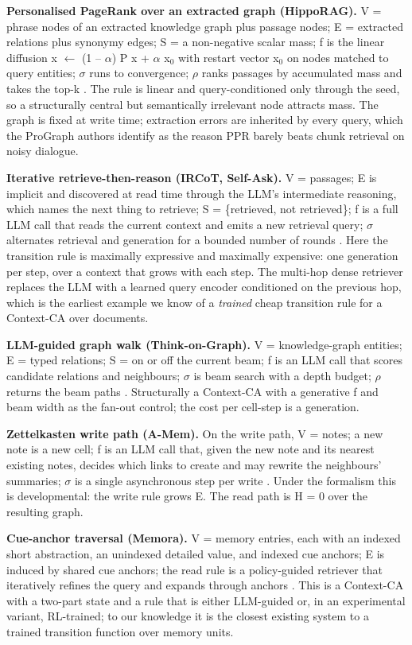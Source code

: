 \documentclass[11pt]{article}
\begin{document}
\textbf{Personalised PageRank over an extracted graph (HippoRAG).} V = phrase nodes of an extracted knowledge graph plus passage nodes; E = extracted relations plus synonymy edges; S = a non-negative scalar mass; f is the linear diffusion x $\leftarrow$ (1 -- $\alpha$) P x + $\alpha$ x$_0$ with restart vector x$_0$ on nodes matched to query entities; $\sigma$ runs to convergence; $\rho$ ranks passages by accumulated mass and takes the top-k \cite{hipporag}. The rule is linear and query-conditioned only through the seed, so a structurally central but semantically irrelevant node attracts mass. The graph is fixed at write time; extraction errors are inherited by every query, which the ProGraph authors identify as the reason PPR barely beats chunk retrieval on noisy dialogue.

\textbf{Iterative retrieve-then-reason (IRCoT, Self-Ask).} V = passages; E is implicit and discovered at read time through the LLM's intermediate reasoning, which names the next thing to retrieve; S = \{retrieved, not retrieved\}; f is a full LLM call that reads the current context and emits a new retrieval query; $\sigma$ alternates retrieval and generation for a bounded number of rounds \cite{ircot,selfask}. Here the transition rule is maximally expressive and maximally expensive: one generation per step, over a context that grows with each step. The multi-hop dense retriever \cite{mdr} replaces the LLM with a learned query encoder conditioned on the previous hop, which is the earliest example we know of a \emph{trained} cheap transition rule for a Context-CA over documents.

\textbf{LLM-guided graph walk (Think-on-Graph).} V = knowledge-graph entities; E = typed relations; S = on or off the current beam; f is an LLM call that scores candidate relations and neighbours; $\sigma$ is beam search with a depth budget; $\rho$ returns the beam paths \cite{tog}. Structurally a Context-CA with a generative f and beam width as the fan-out control; the cost per cell-step is a generation.

\textbf{Zettelkasten write path (A-Mem).} On the write path, V = notes; a new note is a new cell; f is an LLM call that, given the new note and its nearest existing notes, decides which links to create and may rewrite the neighbours' summaries; $\sigma$ is a single asynchronous step per write \cite{amem}. Under the formalism this is developmental: the write rule grows E. The read path is H = 0 over the resulting graph.

\textbf{Cue-anchor traversal (Memora).} V = memory entries, each with an indexed short abstraction, an unindexed detailed value, and indexed cue anchors; E is induced by shared cue anchors; the read rule is a policy-guided retriever that iteratively refines the query and expands through anchors \cite{memora}. This is a Context-CA with a two-part state and a rule that is either LLM-guided or, in an experimental variant, RL-trained; to our knowledge it is the closest existing system to a trained transition function over memory units.
\end{document}
